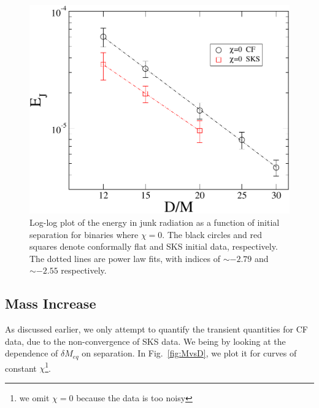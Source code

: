 

\begin{figure}
\includegraphics[scale=0.95]{chap5/EvsD}
 \caption{Log-log plot of the energy in junk radiation as a function
   of initial separation for binaries where $\chi=0$. The black circles and red squares denote conformally flat and SKS initial
   data, respectively. The dotted lines are
   power law fits, with indices of $\sim -2.79$ and $\sim
   -2.55$ respectively.}
 \label{fig:EvsD}
\end{figure}

\subsection{Mass Increase}
\label{subsec:MassIncrease}
As discussed earlier, we only attempt to quantify the transient
quantities for CF data, due to the non-convergence of SKS data. We
being by looking at the dependence of $\delta M_{eq}$ on
separation. In Fig.~\ref{fig:MvsD}, we plot it for curves of
constant $\chi$\footnote{we omit $\chi=0$ because the data is too
  noisy}. 


